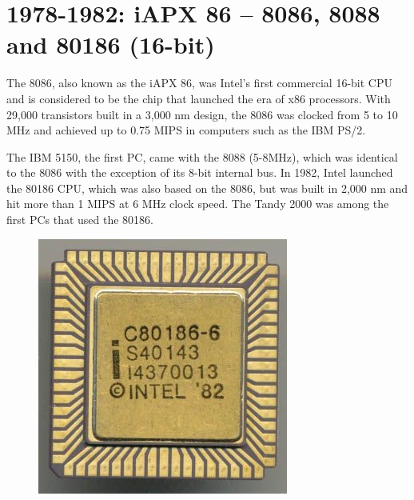 \hypertarget{iapx-86-8086-8088-and-80186-16-bit}{%
\section{1978-1982: iAPX 86 -- 8086, 8088 and 80186
(16-bit)}\label{iapx-86-8086-8088-and-80186-16-bit}}

The 8086, also known as the iAPX 86, was Intel's first commercial 16-bit
CPU and is considered to be the chip that launched the era of x86
processors. With 29,000 transistors built in a 3,000 nm design, the 8086
was clocked from 5 to 10 MHz and achieved up to 0.75 MIPS in computers
such as the IBM PS/2.

The IBM 5150, the first PC, came with the 8088 (5-8MHz), which was
identical to the 8086 with the exception of its 8-bit internal bus. In
1982, Intel launched the 80186 CPU, which was also based on the 8086,
but was built in 2,000 nm and hit more than 1 MIPS at 6 MHz clock speed.
The Tandy 2000 was among the first PCs that used the 80186.


\begin{figure}[h!]
	\centering
	\includegraphics[scale=0.5]{media/image8.jpeg}
\end{figure}



